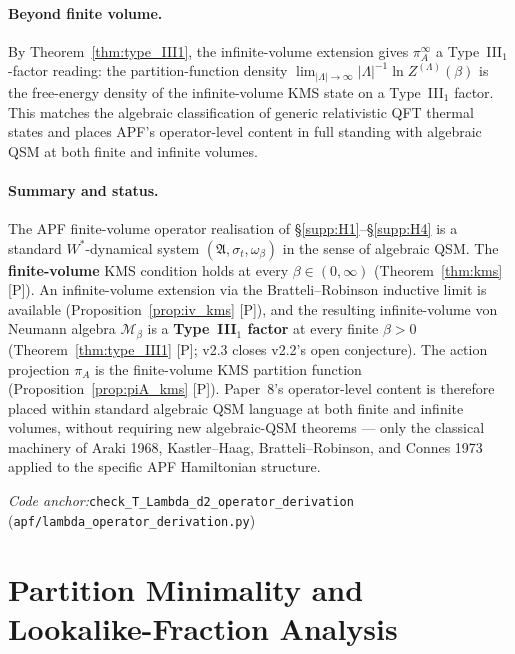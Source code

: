 \documentclass[11pt]{article}
\theoremstyle{plain}
\theoremstyle{definition}
\theoremstyle{remark}
\newcommand{\coderef}[2]{\par\noindent\textit{Code anchor:}\quad\texttt{#1} (\texttt{#2})}
\begin{document}
\paragraph{Beyond finite volume.}  By Theorem~\ref{thm:type_III1}, the infinite-volume extension gives $\pi_A^\infty$ a Type~III$_1$-factor reading: the partition-function density $\lim_{|\Lambda|\to\infty} |\Lambda|^{-1} \ln Z^{(\Lambda)}(\beta)$ is the free-energy density of the infinite-volume KMS state on a Type~III$_1$ factor.  This matches the algebraic classification of generic relativistic QFT thermal states and places APF's operator-level content in full standing with algebraic QSM at both finite and infinite volumes.

\bigskip

\paragraph{Summary and status.}  The APF finite-volume operator realisation of \S\ref{supp:H1}--\S\ref{supp:H4} is a standard $W^*$-dynamical system $(\mathfrak{A}, \sigma_t, \omega_\beta)$ in the sense of algebraic QSM.  The \textbf{finite-volume} KMS condition holds at every $\beta \in (0, \infty)$ (Theorem~\ref{thm:kms} [P]).  An infinite-volume extension via the Bratteli--Robinson inductive limit is available (Proposition~\ref{prop:iv_kms} [P]), and the resulting infinite-volume von Neumann algebra $\mathcal{M}_\beta$ is a \textbf{Type~III$_1$ factor} at every finite $\beta > 0$ (Theorem~\ref{thm:type_III1} [P]; v2.3 closes v2.2's open conjecture).  The action projection $\pi_A$ is the finite-volume KMS partition function (Proposition~\ref{prop:piA_kms} [P]).  Paper~8's operator-level content is therefore placed within standard algebraic QSM language at both finite and infinite volumes, without requiring new algebraic-QSM theorems --- only the classical machinery of Araki 1968, Kastler--Haag, Bratteli--Robinson, and Connes 1973 applied to the specific APF Hamiltonian structure.

\coderef{check\_T\_Lambda\_d2\_operator\_derivation}{apf/lambda\_operator\_derivation.py}

\section{Partition Minimality and Lookalike-Fraction Analysis}\label{supp:I}
\end{document}
